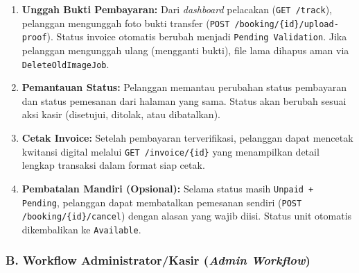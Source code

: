 \documentclass[11pt, a5paper]{article}
\begin{document}
\begin{enumerate}[label=\arabic*.]
  \item \textbf{Unggah Bukti Pembayaran:} Dari \textit{dashboard} pelacakan
        (\texttt{GET /track}), pelanggan mengunggah foto bukti transfer
        (\texttt{POST /booking/\{id\}/upload-proof}). Status invoice otomatis
        berubah menjadi \texttt{Pending Validation}. Jika pelanggan mengunggah
        ulang (mengganti bukti), file lama dihapus aman via
        \texttt{DeleteOldImageJob}.

  \item \textbf{Pemantauan Status:} Pelanggan memantau perubahan status pembayaran
        dan status pemesanan dari halaman yang sama. Status akan berubah sesuai
        aksi kasir (disetujui, ditolak, atau dibatalkan).

  \item \textbf{Cetak Invoice:} Setelah pembayaran terverifikasi, pelanggan
        dapat mencetak kwitansi digital melalui \texttt{GET /invoice/\{id\}} yang
        menampilkan detail lengkap transaksi dalam format siap cetak.

  \item \textbf{Pembatalan Mandiri (Opsional):} Selama status masih
        \texttt{Unpaid + Pending}, pelanggan dapat membatalkan pemesanan sendiri
        (\texttt{POST /booking/\{id\}/cancel}) dengan alasan yang wajib diisi.
        Status unit otomatis dikembalikan ke \texttt{Available}.
\end{enumerate}

\subsubsection*{B. Workflow Administrator/Kasir (\textit{Admin Workflow})}
\end{document}

